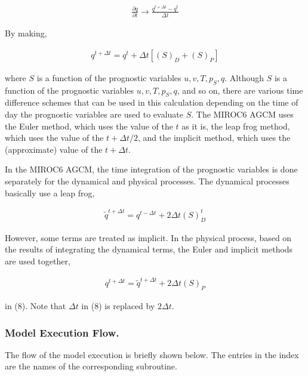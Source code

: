 \begin{eqnarray}
  \frac{\partial{q}}{\partial {t}} \rightarrow \frac{q^{t+\Delta t} - q^{t}}{\Delta t}
\end{eqnarray}

By making,

\begin{eqnarray}
  q^{t+\Delta t} = q^{t}
       + \Delta t \left[ \left( S \right)_D + \left( S \right)_P  \right]
\end{eqnarray}

where \(S\) is a function of the prognostic variables \(u,v,T,p_S,q\).
Although \(S\) is a function of the prognostic variables
\(u,v,T,p_S,q\), and so on, there are various time difference schemes
that can be used in this calculation depending on the time of day the
prognostic variables are used to evaluate \(S\). The MIROC6 AGCM uses
the Euler method, which uses the value of the \(t\) as it is, the leap
frog method, which uses the value of the \(t+\Delta t/2\), and the
implicit method, which uses the (approximate) value of the
\(t+\Delta t\).

In the MIROC6 AGCM, the time integration of the prognostic variables is
done separately for the dynamical and physical processes. The dynamical
processes basically use a leap frog,

\begin{eqnarray}
  \tilde{q}^{t+\Delta t} = q^{t-\Delta t} + 2 \Delta t \left( S \right)_D^{t}
\end{eqnarray}

However, some terms are treated as implicit. In the physical process,
based on the results of integrating the dynamical terms, the Euler and
implicit methods are used together,

\begin{eqnarray}
  q^{t+\Delta t} = \tilde{q}^{t+\Delta t} + 2 \Delta t \left( S \right)_P
\end{eqnarray}

in (8). Note that \(\Delta t\) in (8) is replaced by \(2 \Delta t\).

\hypertarget{model-execution-flow.}{%
\subsubsection{Model Execution Flow.}\label{model-execution-flow.}}

The flow of the model execution is briefly shown below. The entries in
the index are the names of the corresponding subroutine.

